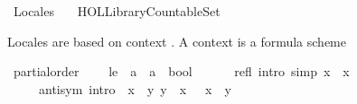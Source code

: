 %
\begin{isabellebody}%
%
%
\isadelimtheory
%
\endisadelimtheory
%
\isatagtheory
{}\isamarkupfalse%
\ Locales\isanewline
\ \ \ {\isachardoublequoteopen}HOL{\isacharminus}{\kern0pt}Library{\isachardot}{\kern0pt}Countable{\isacharunderscore}{\kern0pt}Set{\isachardoublequoteclose}\ \isanewline
{}%
\endisatagtheory
{\isafoldtheory}%
%
\isadelimtheory
%
\endisadelimtheory
%
\isadelimdocument
%
\endisadelimdocument
%
\isatagdocument
%
\isamarkuptrue%
%
\endisatagdocument
{\isafolddocument}%
%
\isadelimdocument
%
\endisadelimdocument
%
\begin{isamarkuptext}%
Locales are based on context . 
A context is a formula scheme  %
\end{isamarkuptext}\isamarkuptrue%
\isamarkupfalse%
\ partial{\isacharunderscore}{\kern0pt}order\ {\isacharequal}{\kern0pt}\isanewline
\ \ \ le\ {\isacharcolon}{\kern0pt}{\isacharcolon}{\kern0pt}\ {\isachardoublequoteopen}{\isacharprime}{\kern0pt}a\ {\isasymRightarrow}\ {\isacharprime}{\kern0pt}a\ {\isasymRightarrow}\ bool{\isachardoublequoteclose}\ {\isacharparenleft}{\kern0pt}\ {\isachardoublequoteopen}{\isasymsqsubseteq}{\isachardoublequoteclose}\ {}{}{\isacharparenright}{\kern0pt}\isanewline
\ \ \ refl\ {\isacharbrackleft}{\kern0pt}intro{\isacharcomma}{\kern0pt}\ simp{\isacharbrackright}{\kern0pt}{\isacharcolon}{\kern0pt}\ {\isachardoublequoteopen}x\ {\isasymsqsubseteq}\ x{\isachardoublequoteclose}\isanewline
\ \ \ \ \ anti{\isacharunderscore}{\kern0pt}sym\ {\isacharbrackleft}{\kern0pt}intro{\isacharbrackright}{\kern0pt}{\isacharcolon}{\kern0pt}\ {\isachardoublequoteopen}{\isasymlbrakk}\ x\ {\isasymsqsubseteq}\ y{\isacharsemicolon}{\kern0pt}\ y\ {\isasymsqsubseteq}\ x\ {\isasymrbrakk}\ {\isasymLongrightarrow}\ x\ {\isacharequal}{\kern0pt}\ y{\isachardoublequoteclose}\isanewline

\end{isabellebody}
